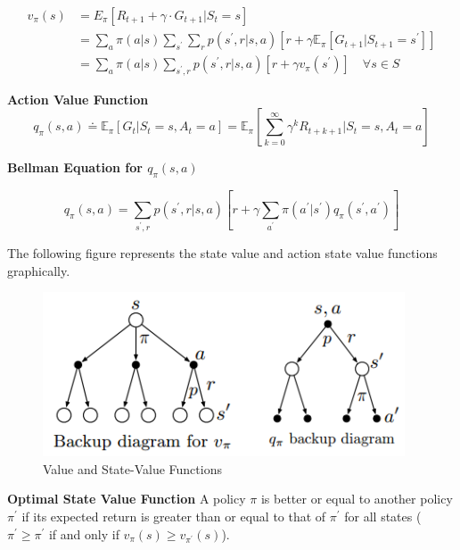 \documentclass{article}
\begin{document}
\begin{equation}
\begin{aligned}
v_{\pi}(s) &= E_{\pi}[R_{t+1}+\gamma \cdot G_{t+1} | S_{t}=s] \\
&= \sum_{a} \pi(a | s) \sum_{s^{\prime}} \sum_{r} p(s^{\prime}, r|s, a)[r+\gamma \mathbb{E}_{\pi}[G_{t+1} | S_{t+1}=s^{\prime}]]\\
&=\sum_{a} \pi(a | s) \sum_{s^{\prime}, r} p\left(s^{\prime}, r | s, a\right)\left[r+\gamma v_{\pi}\left(s^{\prime}\right)\right] \quad \forall s \in S
\end{aligned}
\end{equation}

\noindent
\textbf{Action Value Function}
\begin{equation}
q_{\pi}(s, a) \doteq \mathbb{E}_{\pi}\left[G_{t} | S_{t}=s, A_{t}=a\right]=\mathbb{E}_{\pi}\left[\sum_{k=0}^{\infty} \gamma^{k} R_{t+k+1} | S_{t}=s, A_{t}=a\right]
\end{equation}

\noindent
\textbf{Bellman Equation for $q_{\pi}(s, a)$}

\begin{equation}
q_{\pi}(s, a)=\sum_{s^{\prime}, r} p\left(s^{\prime}, r | s, a\right)\left[r+\gamma \sum_{a^{\prime}} \pi\left(a^{\prime} | s^{\prime}\right) q_{\pi}\left(s^{\prime}, a^{\prime}\right)\right]
\end{equation}

\noindent
The following figure represents the state value and action state value functions
graphically.

\begin{figure}[h]
\includegraphics[scale=0.5]{value_functions}
\centering
\caption{Value and State-Value Functions}
\end{figure}

\noindent
\textbf{Optimal State Value Function}
A policy $\pi$ is better or equal to another policy $\pi^{\prime}$ if its
expected return is greater than or equal to that of $\pi^{\prime}$ for all
states ($\pi^{\prime} \geq \pi^{\prime}$ if and only if $v_{\pi}(s) \geq
v_{\pi^{\prime}}(s)$). 
\end{document}
